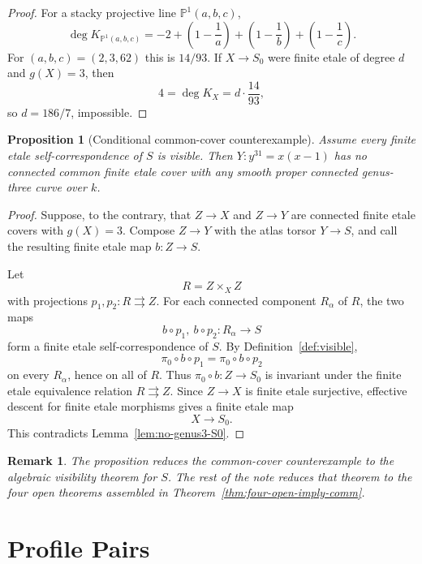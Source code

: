 \documentclass[11pt]{amsart}
\newtheorem{proposition}[theorem]{Proposition}
\newtheorem{remark}[theorem]{Remark}
\newcommand{\PP}{\mathbb P}
\begin{document}
\begin{proof}
For a stacky projective line \(\PP^1(a,b,c)\),
\[
  \deg K_{\PP^1(a,b,c)}
  =
  -2+\left(1-\frac1a\right)+\left(1-\frac1b\right)
      +\left(1-\frac1c\right).
\]
For \((a,b,c)=(2,3,62)\) this is \(14/93\).  If \(X\to S_0\) were finite
etale of degree \(d\) and \(g(X)=3\), then
\[
  4=\deg K_X=d\cdot\frac{14}{93},
\]
so \(d=186/7\), impossible.
\end{proof}

\begin{proposition}[Conditional common-cover counterexample]
\label{prop:conditional-common-cover}
Assume every finite etale self-correspondence of \(S\) is visible.  Then
\(Y:y^{31}=x(x-1)\) has no connected common finite etale cover with any smooth
proper connected genus-three curve over \(k\).
\end{proposition}

\begin{proof}
Suppose, to the contrary, that \(Z\to X\) and \(Z\to Y\) are connected finite
etale covers with \(g(X)=3\).  Compose \(Z\to Y\) with the atlas torsor
\(Y\to S\), and call the resulting finite etale map \(b:Z\to S\).

Let
\[
  R=Z\times_X Z
\]
with projections \(p_1,p_2:R\rightrightarrows Z\).  For each connected
component \(R_\alpha\) of \(R\), the two maps
\[
  b\circ p_1,\ b\circ p_2:R_\alpha\to S
\]
form a finite etale self-correspondence of \(S\).  By
Definition~\ref{def:visible},
\[
  \pi_0\circ b\circ p_1=\pi_0\circ b\circ p_2
\]
on every \(R_\alpha\), hence on all of \(R\).  Thus
\(\pi_0\circ b:Z\to S_0\) is invariant under the finite etale equivalence
relation \(R\rightrightarrows Z\).  Since \(Z\to X\) is finite etale
surjective, effective descent for finite etale morphisms gives a finite etale
map
\[
  X\to S_0.
\]
This contradicts Lemma~\ref{lem:no-genus3-S0}.
\end{proof}

\begin{remark}
The proposition reduces the common-cover counterexample to the algebraic
visibility theorem for \(S\).  The rest of the note reduces that theorem to
the four open theorems assembled in
Theorem~\ref{thm:four-open-imply-comm}.
\end{remark}

\section{Profile Pairs}
\label{sec:profile-pairs}
\end{document}
